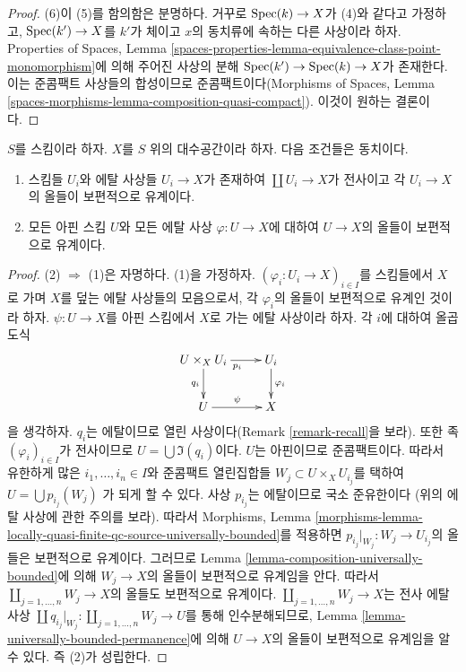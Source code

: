\begin{proof}
\medskip\noindent
(6)이 (5)를 함의함은 분명하다. 거꾸로 $\mathop{\mathrm{Spec}}(k) \to X$가 (4)와 같다고
가정하고, $\mathop{\mathrm{Spec}}(k') \to X$를 $k'$가 체이고 $x$의 동치류에 속하는
다른 사상이라 하자. Properties of Spaces, Lemma
\ref{spaces-properties-lemma-equivalence-class-point-monomorphism}에 의해
주어진 사상의 분해 $\mathop{\mathrm{Spec}}(k') \to \mathop{\mathrm{Spec}}(k) \to X$가 존재한다.
이는 준콤팩트 사상들의 합성이므로 준콤팩트이다(Morphisms of Spaces,
Lemma \ref{spaces-morphisms-lemma-composition-quasi-compact}). 이것이
원하는 결론이다.
\end{proof}

\begin{lemma}
\label{lemma-U-universally-bounded}
$S$를 스킴이라 하자. $X$를 $S$ 위의 대수공간이라 하자.
다음 조건들은 동치이다.
\begin{enumerate}
\item 스킴들 $U_i$와 에탈 사상들 $U_i \to X$가 존재하여
$\coprod U_i \to X$가 전사이고 각 $U_i \to X$의 올들이 보편적으로
유계이다.
\item 모든 아핀 스킴 $U$와 모든 에탈 사상 $\varphi : U \to X$에 대하여
$U \to X$의 올들이 보편적으로 유계이다.
\end{enumerate}
\end{lemma}

\begin{proof}
(2) $\Rightarrow$ (1)은 자명하다. (1)을 가정하자.
$(\varphi_i : U_i \to X)_{i \in I}$를 스킴들에서 $X$로 가며 $X$를 덮는
에탈 사상들의 모음으로서, 각 $\varphi_i$의 올들이 보편적으로 유계인
것이라 하자. $\psi : U \to X$를 아핀 스킴에서 $X$로 가는 에탈
사상이라 하자. 각 $i$에 대하여 올곱 도식
$$
\xymatrix{
U \times_X U_i \ar[r]_{p_i} \ar[d]_{q_i} & U_i \ar[d]^{\varphi_i} \\
U \ar[r]^\psi & X
}
$$
을 생각하자. $q_i$는 에탈이므로 열린 사상이다(Remark
\ref{remark-recall}을 보라). 또한 족 $(\varphi_i)_{i \in I}$가
전사이므로 $U = \bigcup \Im(q_i)$이다. $U$는 아핀이므로 준콤팩트이다.
따라서 유한하게 많은 $i_1, \ldots, i_n \in I$와 준콤팩트 열린집합들
$W_j \subset U \times_X U_{i_j}$를 택하여
$U = \bigcup p_{i_j}(W_j)$
가 되게 할 수 있다. 사상 $p_{i_j}$는 에탈이므로 국소 준유한이다
(위의 에탈 사상에 관한 주의를 보라). 따라서 Morphisms, Lemma
\ref{morphisms-lemma-locally-quasi-finite-qc-source-universally-bounded}를
적용하면 $p_{i_j}|_{W_j} : W_j \to U_{i_j}$의 올들은 보편적으로
유계이다. 그러므로 Lemma \ref{lemma-composition-universally-bounded}에
의해 $W_j \to X$의 올들이 보편적으로 유계임을 안다.
따라서 $\coprod_{j = 1, \ldots, n} W_j \to X$의 올들도 보편적으로
유계이다. $\coprod_{j = 1, \ldots, n} W_j \to X$는 전사 에탈 사상
$\coprod q_{i_j}|_{W_j} : \coprod_{j = 1, \ldots, n} W_j \to U$를
통해 인수분해되므로, Lemma \ref{lemma-universally-bounded-permanence}에
의해 $U \to X$의 올들이 보편적으로 유계임을 알 수 있다.
즉 (2)가 성립한다.
\end{proof}

